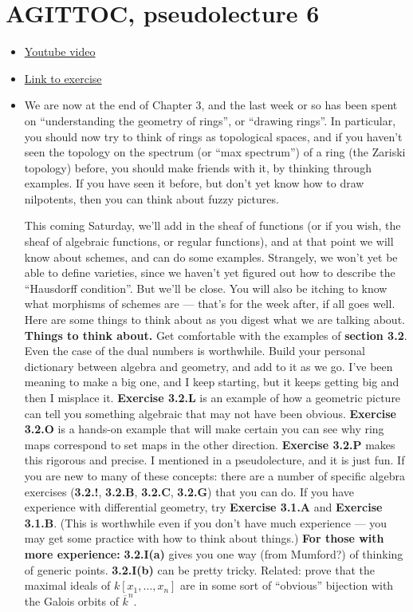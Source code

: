 \documentclass{book}
\theoremstyle{definition}
\begin{document}
\chapter{AGITTOC, pseudolecture 6}
\begin{itemize}
    \item \href{https://www.youtube.com/watch?v=zS3I4KKmtW0}{Youtube video}
    \item \href{https://math216.wordpress.com/2020/08/04/between-pseudolectures-6-and-7/}{Link to exercise}
    \item We are now at the end of Chapter 3, and the last week or so has been
    spent on ``understanding the geometry of rings'', or ``drawing rings''. In
    particular, you should now try to think of rings as topological spaces, and
    if you haven’t seen the topology on the spectrum (or ``max spectrum'') of a
    ring (the Zariski topology) before, you should make friends with it, by
    thinking through examples. If you have seen it before, but don’t yet know
    how to draw nilpotents, then you can think about fuzzy pictures.

    This coming Saturday, we’ll add in the sheaf of functions (or if you wish,
    the sheaf of algebraic functions, or regular functions), and at that point
    we will know about schemes, and can do some examples. Strangely, we won’t
    yet be able to define varieties, since we haven’t yet figured out how to
    describe the ``Hausdorff condition''. But we’ll be close.
    You will also be itching to know what morphisms of schemes are — that’s for the
    week after, if all goes well.
    Here are some things to think about as you digest what we are talking about.
    \textbf{Things to think about.}
    Get comfortable with the examples of \textbf{section 3.2}. Even the case of
    the dual numbers is worthwhile.
    Build your personal dictionary between algebra and geometry, and add to it as
    we go. I’ve been meaning to make a big one, and I keep starting, but it keeps
    getting big and then I misplace it.
    \textbf{Exercise 3.2.L} is an example of how a geometric picture can tell you
    something algebraic that may not have been obvious. 
    \textbf{Exercise 3.2.O} is a hands-on example that will make certain you
    can see why ring maps correspond to set maps in the other direction.
    \textbf{Exercise 3.2.P} makes this rigorous and precise.
    I mentioned  in a pseudolecture, and it is just fun.
    If you are new to many of these concepts: there are a number of specific
    algebra exercises (\textbf{3.2.!}, \textbf{3.2.B}, \textbf{3.2.C},
    \textbf{3.2.G}) that you can do.
    If you have experience with differential geometry, try \textbf{Exercise 3.1.A}
    and \textbf{Exercise 3.1.B}. (This is worthwhile even if you don’t have much
    experience — you may get some practice with how to think about things.)
    \textbf{For those with more experience:}
    \textbf{3.2.I(a)} gives you one way (from Mumford?) of thinking of generic
    points. \textbf{3.2.I(b)} can be pretty tricky.
    Related: prove that the maximal ideals of $k[x_1, \dots, x_n]$ are in some
    sort of ``obvious'' bijection with the Galois orbits of $\overline{k}^n$.


\end{itemize}
\end{document}
